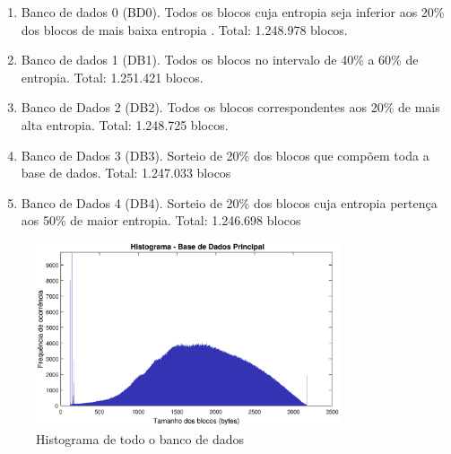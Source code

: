 \begin {enumerate}
\label{list:bds}
\item Banco de dados 0 (BD0). Todos os blocos cuja entropia seja inferior aos 20\% dos blocos de mais baixa entropia . Total: 1.248.978 blocos. 
\item Banco de dados 1 (DB1). Todos os blocos no intervalo de 40\% a 60\% de entropia. Total: 1.251.421 blocos.
\item Banco de Dados 2 (DB2). Todos os blocos correspondentes aos 20\% de mais alta entropia. Total: 1.248.725 blocos.
\item Banco de Dados 3 (DB3). Sorteio de 20\% dos blocos que compõem toda a base de dados. Total: 1.247.033 blocos
\item Banco de Dados 4 (DB4). Sorteio de 20\% dos blocos cuja entropia pertença aos 50\% de maior entropia. Total: 1.246.698 blocos
\end{enumerate}




\begin{figure}[htbp]
\centering
\includegraphics[width=0.80\textwidth]{figuras/hist.eps}
\caption[Histograma de todo o banco de dados]{Histograma de todo o banco de dados}
\label{fig:histdatabase}
\end{figure}

